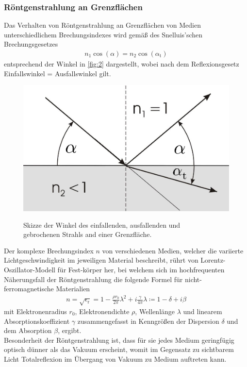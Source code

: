 \documentclass[12pt]{article}
\begin{document}
\subsubsection{Röntgenstrahlung an Grenzflächen}
Das Verhalten von Röntgenstrahlung an Grenzflächen von Medien unterschiedlichem Brechungsindexes wird gemäß des Snelluis'schen Brechungsgesetzes
\begin{align}
  n_1 \cos(\alpha) = n_2 \cos(\alpha_\text{t})\label{eq:snellius}
\end{align}
entsprechend der Winkel in \autoref{fig:2} dargestellt, wobei nach dem Reflexionsgesetz Einfallswinkel = Ausfallswinkel gilt.
\begin{figure}[H]
  \centering
  \includegraphics[scale=0.3]{Ressourcen/Snellius.png}
  \caption{Skizze der Winkel des einfallenden, ausfallenden und\\ gebrochenen Strahls and einer Grenzfläche.}\cite{uni_giessen}\label{fig:2}
\end{figure}
Der komplexe Brechungsindex $n$ von verschiedenen Medien, welcher die variierte Lichtgeschwindigkeit im jeweiligen Material beschreibt, rührt von Lorentz-Oszillator-Modell für Fest-körper her, bei welchem sich im hochfrequenten Näherungsfall der Röntgenstrahlung die folgende Formel für nicht-ferromagnetische Materialien  
\begin{align}
  n=\sqrt{\epsilon_\text{r}}=1-\frac{\rho r_0}{2\pi}\lambda^2+i \frac{\gamma}{4\pi}\lambda \coloneqq 1-\delta+i\beta\label{eq:n}
\end{align}
mit Elektronenradius $r_0$, Elektronendichte $\rho$, Wellenlänge $\lambda$ und linearem Absorptionskoeffizient $\gamma$ zusammengefasst in Kenngrößen der Dispersion $\delta$ und dem Absorption $\beta$, ergibt. 
\\\linebreak Besonderheit der Röntgenstrahlung ist, dass für sie jedes Medium geringfügig optisch dünner als das Vakuum erscheint, womit im Gegensatz zu sichtbarem Licht Totalreflexion im Übergang von Vakuum zu Medium auftreten kann.
\end{document}
